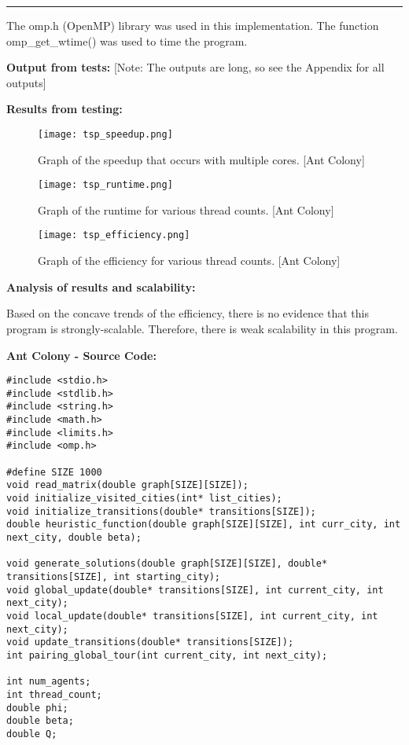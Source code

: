 \documentclass[letter, 12pt]{article}
\newenvironment{question}[1]{%
    \vspace{.2in}%
        \noindent{\bf #1}%
    \vspace{0.3em} \hrule \vspace{.1in}%
}{}
\begin{document}
\begin{question}{\large Traveling Salesperson Problem}
The omp.h (OpenMP) library was used in this implementation. The function omp\_get\_wtime() was used to time the program.

\textbf{Output from tests:} [Note: The outputs are long, so see the Appendix for all outputs]

\textbf{Results from testing:}
\begin{figure}[H]
  \centering
  \texttt{[image: tsp\_speedup.png]}
  \caption{Graph of the speedup that occurs with multiple cores. [Ant Colony]}
  \label{fig:ACspeedup}
\end{figure}

\begin{figure}[H]
  \centering
  \texttt{[image: tsp\_runtime.png]}
  \caption{Graph of the runtime for various thread counts. [Ant Colony]}
  \label{fig:ACruntime}
\end{figure}

\begin{figure}[H]
  \centering
  \texttt{[image: tsp\_efficiency.png]}
  \caption{Graph of the efficiency for various thread counts. [Ant Colony]}
  \label{fig:ACefficiency}
\end{figure}

\textbf{Analysis of results and scalability:}

Based on the concave trends of the efficiency, there is no evidence that this program is strongly-scalable. Therefore, there is weak scalability in this program.

\newpage
\textbf{Ant Colony - Source Code:}
\begin{lstlisting}[style=CStyle]
#include <stdio.h>
#include <stdlib.h>
#include <string.h>
#include <math.h>
#include <limits.h>
#include <omp.h>

#define SIZE 1000
void read_matrix(double graph[SIZE][SIZE]);
void initialize_visited_cities(int* list_cities);
void initialize_transitions(double* transitions[SIZE]);
double heuristic_function(double graph[SIZE][SIZE], int curr_city, int next_city, double beta);

void generate_solutions(double graph[SIZE][SIZE], double* transitions[SIZE], int starting_city);
void global_update(double* transitions[SIZE], int current_city, int next_city);
void local_update(double* transitions[SIZE], int current_city, int next_city);
void update_transitions(double* transitions[SIZE]);
int pairing_global_tour(int current_city, int next_city);

int num_agents;
int thread_count;
double phi;
double beta;
double Q;


\end{lstlisting}
\end{question}
\end{document}
